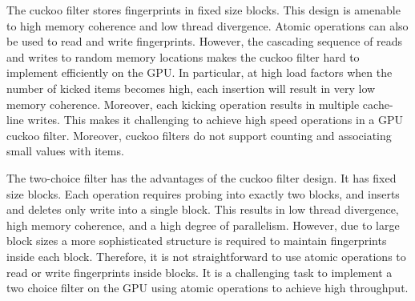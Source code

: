 The cuckoo filter stores fingerprints in fixed size blocks. This design is
amenable to high memory coherence and low thread divergence. Atomic operations
can also be used to read and write fingerprints. However, the cascading sequence
of reads and writes to random memory locations makes the cuckoo filter hard to
implement efficiently on the GPU\@. In particular, at high load factors when the
number of kicked items becomes high, each insertion will result in very low
memory coherence. Moreover, each kicking operation results in multiple
cache-line writes. This makes it challenging to achieve high speed operations in
a GPU cuckoo filter. Moreover, cuckoo filters do not support counting and
associating small values with items.

The two-choice filter has the advantages of the cuckoo filter design. It has
fixed size blocks. Each operation requires probing into exactly two blocks, and
inserts and deletes only write into a single block. This results in low thread
divergence, high memory coherence, and a high degree of parallelism. However,
due to large block sizes a more sophisticated structure is required to maintain
fingerprints inside each block. Therefore, it is not straightforward to use
atomic operations to read or write fingerprints inside blocks. It is a
challenging task to implement a two choice filter on the GPU using atomic
operations to achieve high throughput.

\fi
